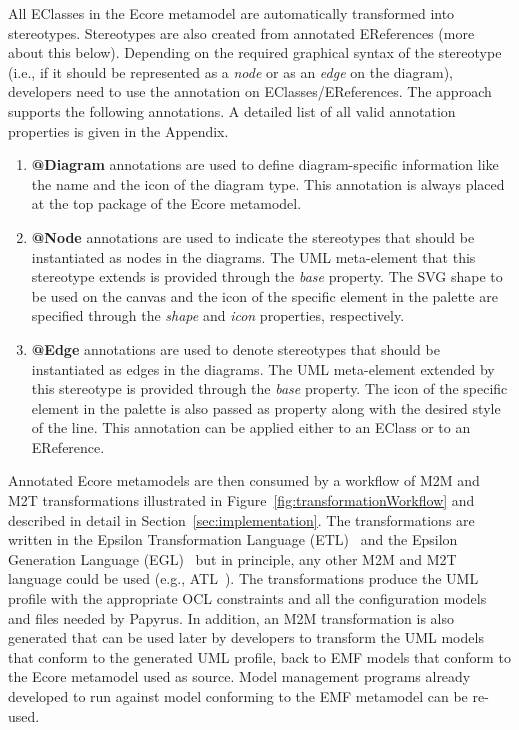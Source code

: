 All EClasses in the Ecore metamodel are automatically transformed into stereotypes. Stereotypes are also created from annotated EReferences (more about this below). Depending on the required graphical syntax of the stereotype (i.e., if it should be represented as a \textit{node} or as an \textit{edge} on the diagram), developers need to use the annotation on EClasses/EReferences. The approach supports the following annotations. A detailed list of all valid annotation properties is given in the Appendix. 
\begin{enumerate}[label=\arabic*.]
	\item \textbf{@Diagram} annotations are used to define diagram-specific 
	information like the name and the icon of the diagram type. This annotation 
	is always placed at the top package of the Ecore metamodel.
	\item \textbf{@Node} annotations are used to indicate the stereotypes that 
	should be instantiated as nodes in the diagrams. The UML meta-element that 
	this stereotype extends is provided through the \emph{base} property. The 
	SVG shape to be used on the canvas and the icon of the specific element in 
	the palette are specified through the \emph{shape} and \emph{icon} 
	properties, respectively.
	\item \textbf{@Edge} annotations are used to denote stereotypes that should be instantiated as edges in the diagrams. The UML meta-element extended by this stereotype is provided through the \emph{base} property. The icon of the specific element in the palette is also passed as property along with the desired style of the line. This annotation can be applied either to an EClass or to an EReference.
\end{enumerate}

Annotated Ecore metamodels are then consumed by a workflow of M2M and M2T 
transformations illustrated in Figure~\ref{fig:transformationWorkflow} and 
described in detail in Section~\ref{sec:implementation}. The transformations 
are written in the Epsilon Transformation Language (ETL)~\cite{Kolovos2008} and 
the Epsilon Generation Language (EGL)~\cite{rose2008egl} but in principle, any 
other M2M and M2T language could be used (e.g., ATL~\cite{jouault2006atl}). The 
transformations produce the UML 
profile with the appropriate OCL constraints and all the configuration models 
and files needed by Papyrus. In addition, an M2M transformation is also generated that can be used 
later by developers to transform the UML models that conform to the generated 
UML profile, back to EMF models that conform to the Ecore metamodel used as 
source. Model management programs already developed to run against model 
conforming to the EMF metamodel can be re-used.

